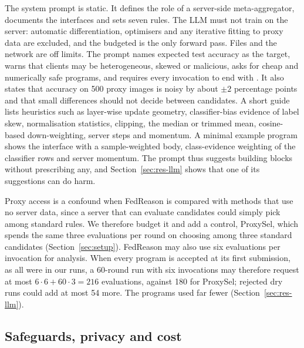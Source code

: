 \documentclass[3p,times,a4paper]{elsarticle}
\newcommand{\code}[1]{\texttt{\detokenize{#1}}}
\begin{document}
The system prompt is static. It defines the role of a server-side meta-aggregator, documents the interfaces and sets seven rules. The LLM must not train on the server: automatic differentiation, optimisers and any iterative fitting to proxy data are excluded, and the budgeted \code{proxy_eval} is the only forward pass. Files and the network are off limits. The prompt names expected test accuracy as the target, warns that clients may be heterogeneous, skewed or malicious, asks for cheap and numerically safe programs, and requires every invocation to end with \code{submit_policy}. It also states that accuracy on 500 proxy images is noisy by about $\pm2$ percentage points and that small differences should not decide between candidates. A short guide lists heuristics such as layer-wise update geometry, classifier-bias evidence of label skew, normalisation statistics, clipping, the median or trimmed mean, cosine-based down-weighting, server steps and momentum. A minimal example program shows the interface with a sample-weighted body, class-evidence weighting of the classifier rows and server momentum. The prompt thus suggests building blocks without prescribing any, and Section~\ref{sec:res-llm} shows that one of its suggestions can do harm.

Proxy access is a confound when FedReason is compared with methods that use no server data, since a server that can evaluate candidates could simply pick among standard rules. We therefore budget it and add a control, ProxySel, which spends the same three evaluations per round on choosing among three standard candidates (Section~\ref{sec:setup}). FedReason may also use six evaluations per invocation for analysis. When every program is accepted at its first submission, as all were in our runs, a 60-round run with six invocations may therefore request at most $6\cdot6+60\cdot3=216$ evaluations, against 180 for ProxySel; rejected dry runs could add at most 54 more. The programs used far fewer (Section~\ref{sec:res-llm}).

\subsection{Safeguards, privacy and cost}
\label{sec:privacy}
\end{document}
